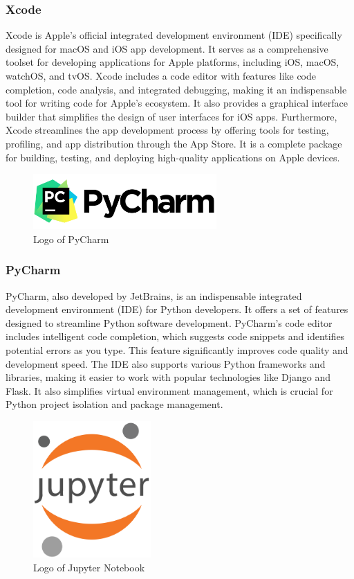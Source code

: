 \documentclass[conference]{IEEEtran}
\begin{document}
        \subsubsection{Xcode}
         Xcode is Apple's official integrated development environment (IDE) specifically designed for macOS and iOS app development. It serves as a comprehensive toolset for developing applications for Apple platforms, including iOS, macOS, watchOS, and tvOS. Xcode includes a code editor with features like code completion, code analysis, and integrated debugging, making it an indispensable tool for writing code for Apple's ecosystem. It also provides a graphical interface builder that simplifies the design of user interfaces for iOS apps. Furthermore, Xcode streamlines the app development process by offering tools for testing, profiling, and app distribution through the App Store. It is a complete package for building, testing, and deploying high-quality applications on Apple devices.\\
    
        \begin{figure}[htbp]
        \centerline{\includegraphics[width=7cm]{Images/logo/pycharm.png}}
        \label{fig}
        \caption{Logo of PyCharm}
        \end{figure}
        \subsubsection{PyCharm}
        PyCharm, also developed by JetBrains, is an indispensable integrated development environment (IDE) for Python developers. It offers a set of features designed to streamline Python software development. PyCharm's code editor includes intelligent code completion, which suggests code snippets and identifies potential errors as you type. This feature significantly improves code quality and development speed. The IDE also supports various Python frameworks and libraries, making it easier to work with popular technologies like Django and Flask. It also simplifies virtual environment management, which is crucial for Python project isolation and package management.\\
        
        \begin{figure}[htbp]
        \centerline{\includegraphics[width=4.5cm]{Images/logo/jupyter.png}}
        \label{fig}
        \caption{Logo of Jupyter Notebook}
        \end{figure}
\end{document}
